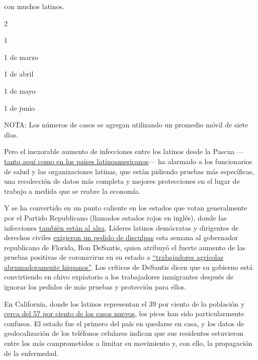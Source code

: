 con muchos latinos.

2

1

1 de marzo

1 de abril

1 de mayo

1 de junio

NOTA: Los números de casos se agregan utilizando un promedio móvil de
siete días.

Pero el inexorable aumento de infecciones entre los latinos desde la
Pascua
---\href{https://www.nytimes3xbfgragh.onion/es/2020/06/24/espanol/america-latina/coronavirus-mexico-brasil-peru-chile-uruguay.html}{tanto
aquí como en los países latinoamericanos}--- ha alarmado a los
funcionarios de salud y las organizaciones latinas, que están pidiendo
pruebas más específicas, una recolección de datos más completa y mejores
protecciones en el lugar de trabajo a medida que se reabre la economía.

Y se ha convertido en un punto caliente en los estados que votan
generalmente por el Partido Republicano (llamados estados rojos en
inglés), donde las infecciones
\href{https://www.nytimes3xbfgragh.onion/interactive/2020/us/coronavirus-us-cases.html?action=click\&module=Top\%20Stories\&pgtype=Homepage\#states}{también
están al alza}. Líderes latinos demócratas y dirigentes de derechos
civiles
\href{https://www.tampabay.com/news/health/2020/06/19/ron-desantis-blames-florida-farmworkers-for-covid-aid-groups-say-testing-help-came-late/}{exigieron
un pedido de disculpas} esta semana al gobernador republicano de
Florida, Ron DeSantis, quien atribuyó el fuerte aumento de las pruebas
positivas de coronavirus en su estado a
\href{https://www.nytimes3xbfgragh.onion/2020/06/18/us/florida-coronavirus-immokalee-farmworkers.html}{``trabajadores
agrícolas abrumadoramente hispanos''}. Los críticos de DeSantis dicen
que su gobierno está convirtiendo en chivo expiatorio a los trabajadores
inmigrantes después de ignorar los pedidos de más pruebas y protección
para ellos.

En California, donde los latinos representan el 39 por ciento de la
población y
\href{https://www.cdph.ca.gov/Programs/CID/DCDC/Pages/COVID-19/Race-Ethnicity.aspx}{cerca
del 57 por ciento de los casos nuevos,} los picos han sido
particularmente confusos. El estado fue el primero del país en quedarse
en casa, y los datos de geolocalización de los teléfonos celulares
indican que sus residentes estuvieron entre los más comprometidos a
limitar su movimiento y, con ello, la propagación de la enfermedad.

